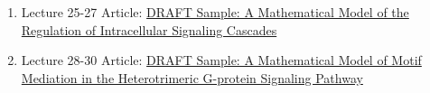 \documentclass{TMLSStyleGuideResumeVitae}
\begin{document}
\begin{enumerate}
\item Lecture 25-27 Article: \href{}{DRAFT Sample: 
A Mathematical Model of the Regulation of Intracellular Signaling Cascades}
\item Lecture 28-30 Article: \href{}{DRAFT Sample: 
A Mathematical Model of Motif Mediation in the Heterotrimeric G-protein Signaling Pathway}
\end{enumerate}
\end{document}
